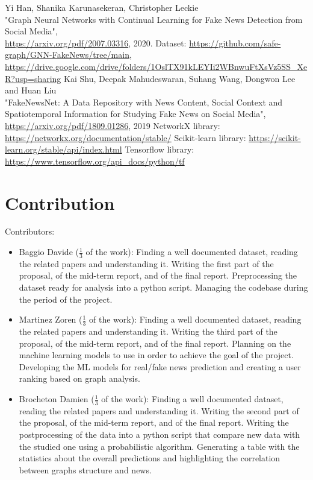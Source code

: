 \documentclass[11pt,a4paper]{article}
\begin{document}
\begin{thebibliography}{9}
	 Yi Han, Shanika Karunasekeran, Christopher Leckie\\"Graph Neural Networks with Continual Learning for Fake News Detection from Social Media",\\ \url{https://arxiv.org/pdf/2007.03316}, 2020.
	 Dataset: \url{https://github.com/safe-graph/GNN-FakeNews/tree/main},\\\url{https://drive.google.com/drive/folders/1OslTX91kLEYIi2WBnwuFtXsVz5SS_XeR?usp=sharing}
	 Kai Shu, Deepak Mahudeswaran, Suhang Wang, Dongwon Lee and Huan Liu\\"FakeNewsNet: A Data Repository with News Content, Social Context and Spatiotemporal Information for Studying Fake News on Social Media",\\ \url{https://arxiv.org/pdf/1809.01286}, 2019
	 NetworkX library: \url{https://networkx.org/documentation/stable/}
	 Scikit-learn library: \url{https://scikit-learn.org/stable/api/index.html}
	 Tensorflow library: \url{https://www.tensorflow.org/api_docs/python/tf}
\end{thebibliography}

\newpage

\section*{Contribution}
Contributors:
\begin{itemize}
	\setlength\itemsep{-0.3em}
	\item Baggio Davide ($\frac{1}{3}$ of the work): Finding a well documented dataset, reading the related papers and understanding it. Writing the first part of the proposal, of the mid-term report, and of the final report. Preprocessing the dataset ready for analysis into a python script. Managing the codebase during the period of the project.
	\item Martinez Zoren ($\frac{1}{3}$ of the work): Finding a well documented dataset,  reading the related papers and understanding it. Writing the third part of the proposal, of the mid-term report, and of the final report. Planning on the machine learning models to use in order to achieve the goal of the project. Developing the ML models for real/fake news prediction and creating a user ranking based on graph analysis.
	\item Brocheton Damien ($\frac{1}{3}$ of the work): Finding a well documented dataset,  reading the related papers and understanding it. Writing the second part of the proposal, of the mid-term report, and of the final report. Writing the postprocessing of the data into a python script that compare new data with the studied one using a probabilistic algorithm. Generating a table with the statistics about the overall predictions and highlighting the correlation between graphs structure and news.
\end{itemize}
\end{document}
